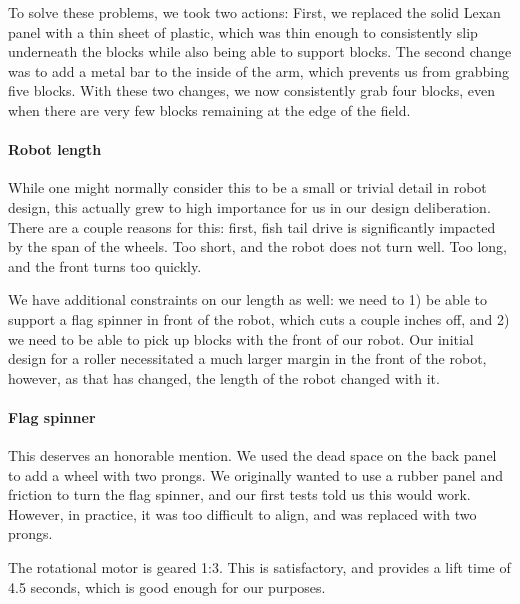 To solve these problems, we took two actions: First, we replaced the solid Lexan panel with a thin sheet of plastic, which was thin enough to consistently slip underneath the blocks while also being able to support blocks. The second change was to add a metal bar to the inside of the arm, which prevents us from grabbing five blocks. With these two changes, we now consistently grab four blocks, even when there are very few blocks remaining at the edge of the field.

\paragraph{Robot length} While one might normally consider this to be a small or trivial detail in robot design, this actually grew to high importance for us in our design deliberation. There are a couple reasons for this: first, fish tail drive is significantly impacted by the span of the wheels. Too short, and the robot does not turn well. Too long, and the front turns too quickly.

We have additional constraints on our length as well: we need to 1) be able to support a flag spinner in front of the robot, which cuts a couple inches off, and 2) we need to be able to pick up blocks with the front of our robot. Our initial design for a roller necessitated a much larger margin in the front of the robot, however, as that has changed, the length of the robot changed with it. 

\paragraph{Flag spinner} This deserves an honorable mention. We used the dead space on the back panel to add a wheel with two prongs. We originally wanted to use a rubber panel and friction to turn the flag spinner, and our first tests told us this would work. However, in practice, it was too difficult to align, and was replaced with two prongs. 

The rotational motor is geared 1:3. This is satisfactory, and provides a lift time of 4.5 seconds, which is good enough for our purposes.